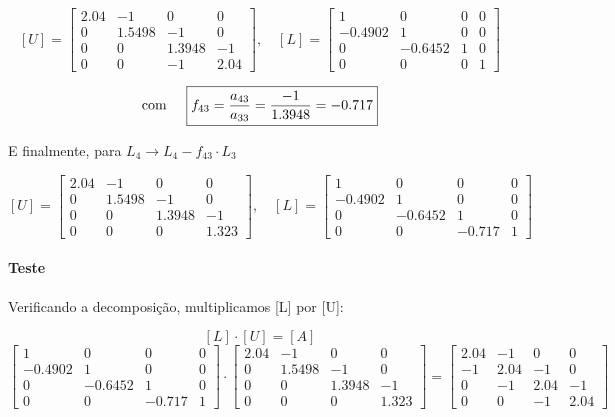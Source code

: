 \documentclass[12pt]{article}
\begin{document}
\[
  [U] = \begin{bmatrix}
    2.04 & -1 & 0 & 0 \\
    0 & 1.5498 & -1 & 0\\
    0 & 0 & 1.3948 & -1 \\
    0 & 0 & -1 & 2.04
  \end{bmatrix}, \quad
  [L] = \begin{bmatrix}
    1 & 0 & 0 & 0 \\
    -0.4902 & 1 & 0 & 0 \\
    0 & -0.6452 & 1 & 0 \\
    0 & 0 & 0 & 1
  \end{bmatrix}
\]

\[
\text{com} \hspace{0.5cm} \boxed{f_{43} = \frac{a_{43}}{a_{33}} = \frac{-1}{1.3948} = -0.717}
\]

E finalmente, para \(L_{4}\rightarrow L_{4} - f_{43} \cdot L_{3}\)

\[
  [U] = \begin{bmatrix}
    2.04 & -1 & 0 & 0 \\
    0 & 1.5498 & -1 & 0\\
    0 & 0 & 1.3948 & -1 \\
    0 & 0 & 0 & 1.323
  \end{bmatrix}, \quad
  [L] = \begin{bmatrix}
    1 & 0 & 0 & 0 \\
    -0.4902 & 1 & 0 & 0 \\
    0 & -0.6452 & 1 & 0 \\
    0 & 0 & -0.717 & 1
  \end{bmatrix}
\]

\paragraph{Teste} Verificando a decomposição, multiplicamos [L] por [U]:

\[
[L]\cdot[U] = [A]
\]
\[
\begin{bmatrix}
    1 & 0 & 0 & 0 \\
    -0.4902 & 1 & 0 & 0 \\
    0 & -0.6452 & 1 & 0 \\
    0 & 0 & -0.717 & 1
  \end{bmatrix}
\cdot
\begin{bmatrix}
    2.04 & -1 & 0 & 0 \\
    0 & 1.5498 & -1 & 0\\
    0 & 0 & 1.3948 & -1 \\
    0 & 0 & 0 & 1.323
  \end{bmatrix} =
\begin{bmatrix}
    2.04 & -1 & 0 & 0 \\
    -1 & 2.04 & -1 & 0\\
    0 & -1 & 2.04 & -1 \\
    0 & 0 & -1 & 2.04
  \end{bmatrix}
\]
\end{document}
